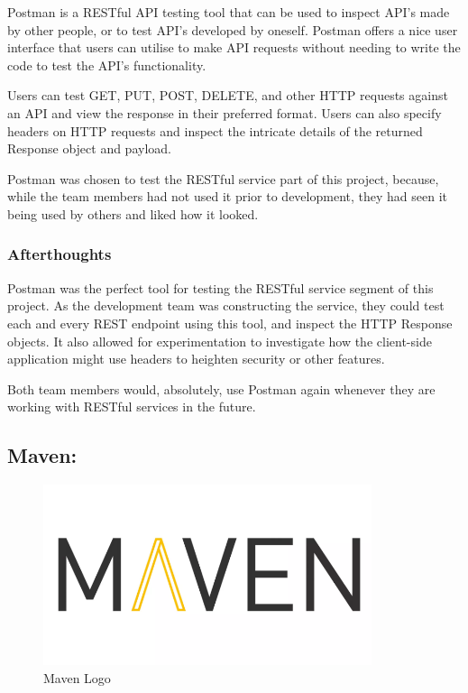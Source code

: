 Postman is a RESTful API testing tool that can be used to inspect API's made by other people, or to test API's developed by oneself. Postman offers a nice user interface that users can utilise to make API requests without needing to write the code to test the API's functionality. 

Users can test GET, PUT, POST, DELETE, and other HTTP requests against an API and view the response in their preferred format. Users can also specify headers on HTTP requests and inspect the intricate details of the returned Response object and payload.

\bigskip

Postman was chosen to test the RESTful service part of this project, because, while the team members had not used it prior to development, they had seen it being used by others and liked how it looked.

\subsubsection{Afterthoughts}
Postman was the perfect tool for testing the RESTful service segment of this project. As the development team was constructing the service, they could test each and every REST endpoint using this tool, and inspect the HTTP Response objects. It also allowed for experimentation to investigate how the client-side application might use headers to heighten security or other features. 

Both team members would, absolutely, use Postman again whenever they are working with RESTful services in the future.


\subsection{Maven:}
\label{sec:TechnologyReviewMaven}

\begin{figure}[H]
    \centering
    \includegraphics[width=\textwidth, height=150pt]{img/MavenLogo.PNG}
    \caption{Maven Logo}
    \label{fig:my_label}
\end{figure}

